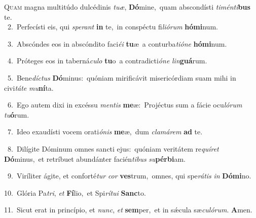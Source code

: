 \lettrine{\initial\textcolor{\initialcolor}{Q}}{uam} magna multitúdo dulcédinis \textit{tu}\-\textit{æ}, \textbf{Dó}\-mine,~\star quam abscondísti \textit{ti}\-\textit{mén}\textit{ti}\textbf{bus} te.\\
{\numbfont\textcolor{\numbcolor}{~2.}}~Perfecísti eis, qui \textit{spe}\-\textit{rant} \textbf{in} te,~\star in conspéctu fi\-\textit{li}\-\textit{ó}\textit{rum} \textbf{hó}\-\textbf{mi}num.\par
{\numbfont\textcolor{\numbcolor}{~3.}}~Abscóndes eos in abscóndito faci\-\textit{é}\-\textit{i} \textbf{tu}\-æ~\star a conturba\-\textit{ti}\-\textit{ó}\textit{ne} \textbf{hó}\-\textbf{mi}num.\par
{\numbfont\textcolor{\numbcolor}{~4.}}~Próteges eos in taberná\-\textit{cu}\-\textit{lo} \textbf{tu}\-o~\star a contradicti\-\textit{ó}\-\textit{ne} \textit{lin}\-\textbf{guá}rum.\par
{\numbfont\textcolor{\numbcolor}{~5.}}~Bene\-\textit{díc}\-\textit{tus} \textbf{Dó}\-minus:~\star quóniam mirificávit misericórdiam suam mihi in civi\-\textit{tá}\-\textit{te} \textit{mu}\-\textbf{ní}ta.\par
{\numbfont\textcolor{\numbcolor}{~6.}}~Ego autem dixi in excéssu \textit{men}\-\textit{tis} \textbf{me}\-æ:~\star Projéctus sum a fácie ocu\-\textit{ló}\-\textit{rum} \textit{tu}\-\textbf{ó}rum.\par
{\numbfont\textcolor{\numbcolor}{~7.}}~Ideo exaudísti vocem orati\-\textit{ó}\-\textit{nis} \textbf{me}\-æ,~\star dum \textit{cla}\-\textit{má}\textit{rem} \textbf{ad} te.\par
{\numbfont\textcolor{\numbcolor}{~8.}}~Dilígite Dóminum omnes sancti ejus:~\dagger quóniam veritátem re\-\textit{quí}\-\textit{ret} \textbf{Dó}\-minus,~\star et retríbuet abundánter facién\-\textit{ti}\-\textit{bus} \textit{su}\-\textbf{pér}\textbf{bi}am.\par
{\numbfont\textcolor{\numbcolor}{~9.}}~Viríliter ágite, et conforté\textit{tur} \textit{cor} \textbf{ves}\-trum,~\star omnes, qui spe\-\textit{rá}\-\textit{tis} \textit{in} \textbf{Dó}\-\textbf{mi}no.\par
{\numbfont\textcolor{\numbcolor}{10.}}~Glória Pa\-\textit{tri}\-, \textit{et} \textbf{Fí}\-lio,~\star et Spi\-\textit{rí}\-\textit{tu}\textit{i} \textbf{Sanc}\-to.\par
{\numbfont\textcolor{\numbcolor}{11.}}~Sicut erat in princípio, et \textit{nunc}\-, \textit{et} \textbf{sem}\-per,~\star et in sǽcula sæ\-\textit{cu}\-\textit{ló}\textit{rum}. \textbf{A}\-men.\par
